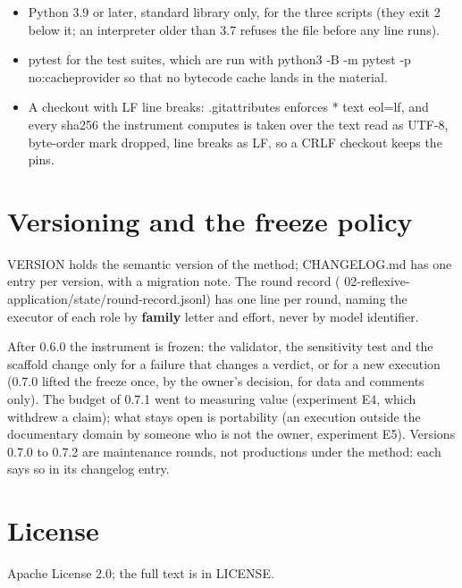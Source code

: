 \documentclass[
  american,
  10pt,
]{report}
\providecommand{\tightlist}{%
  \setlength{\itemsep}{0pt}\setlength{\parskip}{0pt}}
\renewcommand{\texttt}[1]{{\ttfamily\hyphenchar\font=-1 #1}}
\begin{document}
\begin{itemize}
\tightlist
\item
  Python 3.9 or later, standard library only, for the three scripts
  (they exit 2 below it; an interpreter older than 3.7 refuses the file
  before any line runs).
\item
  \texttt{pytest} for the test suites, which are run with
  \texttt{python3 -\allowbreak{}B -\allowbreak{}m pytest -\allowbreak{}p no:\allowbreak{}cacheprovider}
  so that no bytecode cache lands in the material.
\item
  A checkout with LF line breaks: \texttt{.\allowbreak{}gitattributes}
  enforces \texttt{* text eol=lf}, and every sha256 the instrument
  computes is taken over the text read as UTF-8, byte-order mark
  dropped, line breaks as LF, so a CRLF checkout keeps the pins.
\end{itemize}

\section{Versioning and the freeze
policy}\label{versioning-and-the-freeze-policy}

\texttt{VERSION} holds the semantic version of the method;
\texttt{CHANGELOG.\allowbreak{}md} has one entry per version, with a
migration note. The round record
(\texttt{02-\allowbreak{}reflexive-\allowbreak{}application/\allowbreak{}state/\allowbreak{}round-\allowbreak{}record.\allowbreak{}jsonl})
has one line per round, naming the executor of each role by
\textbf{family} letter and effort, never by model identifier.

After 0.6.0 the instrument is frozen: the validator, the sensitivity
test and the scaffold change only for a failure that changes a verdict,
or for a new execution (0.7.0 lifted the freeze once, by the owner's
decision, for data and comments only). The budget of 0.7.1 went to
measuring value (experiment E4, which withdrew a claim); what stays open
is portability (an execution outside the documentary domain by someone
who is not the owner, experiment E5). Versions 0.7.0 to 0.7.2 are
maintenance rounds, not productions under the method: each says so in
its changelog entry.

\section{License}\label{license}

Apache License 2.0; the full text is in \texttt{LICENSE}.
\end{document}
